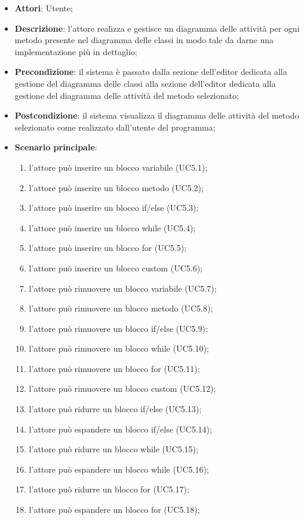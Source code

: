 \begin{itemize}
\item \textbf{Attori}: Utente;
\item \textbf{Descrizione}: l'attore realizza e gestisce un diagramma delle attività per ogni metodo presente nel diagramma delle classi in modo tale da darne una implementazione più in dettaglio;	
\item \textbf{Precondizione}: il sistema è passato dalla sezione dell'editor dedicata alla gestione del diagramma delle classi alla sezione dell'editor dedicata alla gestione del diagramma delle attività del metodo selezionato;	
\item \textbf{Postcondizione}: il sistema visualizza il diagramma delle attività del metodo selezionato come realizzato dall'utente del programma;
\item \textbf{Scenario principale}:
\begin{enumerate}
\item l'attore può inserire un blocco variabile (UC5.1);
\item l'attore può inserire un blocco metodo (UC5.2);
\item l'attore può inserire un blocco if/else (UC5.3);
\item l'attore può inserire un blocco while (UC5.4);
\item l'attore può inserire un blocco for (UC5.5);
\item l'attore può inserire un blocco custom (UC5.6);
\item l'attore può rimuovere un blocco variabile (UC5.7);
\item l'attore può rimuovere un blocco metodo (UC5.8);
\item l'attore può rimuovere un blocco if/else (UC5.9);
\item l'attore può rimuovere  un blocco while (UC5.10);
\item l'attore può rimuovere un blocco for (UC5.11);
\item l'attore può rimuovere un blocco custom (UC5.12);
\item l'attore può ridurre un blocco if/else (UC5.13);
\item l'attore può espandere un blocco if/else (UC5.14);
\item l'attore può ridurre un blocco while (UC5.15);
\item l'attore può espandere un blocco while (UC5.16);
\item l'attore può ridurre un blocco for (UC5.17);
\item l'attore può espandere un blocco for (UC5.18);

\end{enumerate}
\end{itemize}
